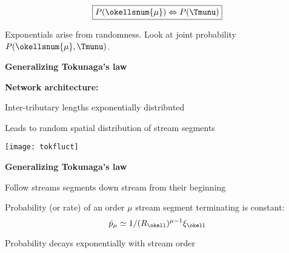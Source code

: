 \begin{frame}[label=]
\begin{frame}[label=]
\begin{frame}[label=]
\begin{frame}[label=]
\begin{frame}[label=]
\begin{frame}[label=]
\begin{frame}[label=]
\begin{frame}[label=]
\begin{frame}[label=]
\begin{frame}[label=]
\begin{frame}[label=]
\begin{frame}[label=]
\begin{frame}[label=]
\begin{frame}[label=]
\begin{frame}[label=]
\begin{frame}[label=]
\begin{frame}[label=]
\begin{frame}[label=]
\begin{frame}[label=]
\begin{frame}[label=]
\begin{frame}[label=]
\begin{frame}[label=]
\begin{frame}[label=]
\begin{frame}[label=]
\begin{frame}[label=]
\begin{frame}[label=]
\begin{frame}[label=]
\begin{frame}[label=]
\begin{frame}[label=]
\begin{frame}[label=]
\begin{frame}[label=]
\begin{frame}[label=]
\begin{frame}[label=]
\begin{frame}[label=]
\begin{frame}[label=]
\begin{frame}[label=]
\begin{frame}[label=]
\begin{frame}[label=]
\begin{frame}[label=]
\begin{frame}[label=]
\begin{frame}[label=]
\begin{frame}[label=]
\begin{frame}[label=]
\begin{frame}[label=]
\begin{frame}[label=]
\begin{frame}[label=]
\begin{frame}[label=]
\begin{frame}[label=]
\begin{frame}[label=]
\begin{frame}[label=]
\begin{frame}[label=]
\begin{frame}[label=]
  \[ \boxed{P(\okellsnum{\mu}) \Leftrightarrow P(\Tmunu)} \]

  
   Exponentials arise from randomness.
   Look at joint probability $P(\okellsnum{\mu},\Tmunu)$.
  


\begin{frame}[label=]
  \textbf{Generalizing Tokunaga's law}

  \textbf{Network architecture:}
          
      
       
        Inter-tributary lengths exponentially distributed
       
        Leads to random spatial distribution of stream segments
      
      
      \texttt{[image: tokfluct]}
      


\begin{frame}[label=]
  \textbf{Generalizing Tokunaga's law}

  
  
    Follow streams segments down stream from their beginning
  
    Probability (or rate) of an order $\mu$ stream segment terminating is \alert{constant}:
    $$
    \tilde{p}_{\mu} \simeq 1/(R_\okell)^{\mu-1}\xi_\okell 
    $$
   
    Probability decays exponentially with stream order
  

\end{frame}
\end{frame}
\end{frame}
\end{frame}
\end{frame}
\end{frame}
\end{frame}
\end{frame}
\end{frame}
\end{frame}
\end{frame}
\end{frame}
\end{frame}
\end{frame}
\end{frame}
\end{frame}
\end{frame}
\end{frame}
\end{frame}
\end{frame}
\end{frame}
\end{frame}
\end{frame}
\end{frame}
\end{frame}
\end{frame}
\end{frame}
\end{frame}
\end{frame}
\end{frame}
\end{frame}
\end{frame}
\end{frame}
\end{frame}
\end{frame}
\end{frame}
\end{frame}
\end{frame}
\end{frame}
\end{frame}
\end{frame}
\end{frame}
\end{frame}
\end{frame}
\end{frame}
\end{frame}
\end{frame}
\end{frame}
\end{frame}
\end{frame}
\end{frame}
\end{frame}
\end{frame}
\end{frame}
